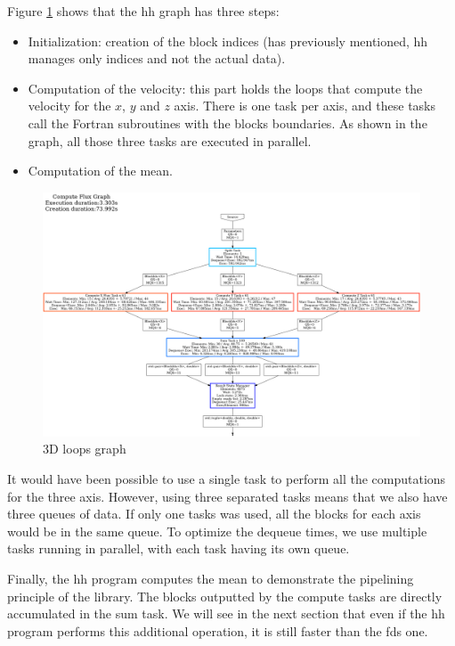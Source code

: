Figure \ref{fig:loopsgraph} shows that the \gls{hh} graph has three steps:

\begin{itemize}
  \item Initialization: creation of the block indices (has previously
    mentioned, \gls{hh} manages only indices and not the actual data).
  \item Computation of the velocity: this part holds the loops that compute the
    velocity for the $x$, $y$ and $z$ axis. There is one task per axis, and
    these tasks call the Fortran subroutines with the blocks boundaries. As
    shown in the graph, all those three tasks are executed in parallel.
  \item Computation of the mean.
\end{itemize}
\clearpage{}

\begin{figure}[h!]
  \begin{center}
    \includegraphics[scale=0.2]{img/fds-loops/graph-61.png}
    \caption{3D loops graph}
    \label{fig:loopsgraph}
  \end{center}
\end{figure}

It would have been possible to use a single task to perform all the computations
for the three axis. However, using three separated tasks means that we also have
three queues of data. If only one tasks was used, all the blocks for each axis
would be in the same queue. To optimize the dequeue times, we use multiple tasks
running in parallel, with each task having its own queue.

Finally,  the \gls{hh} program computes the mean to demonstrate the pipelining
principle of the library. The blocks outputted by the compute tasks are directly
accumulated in the sum task. We will see in the next section that even if the
\gls{hh} program performs this additional operation, it is still faster than the
\gls{fds} one.

